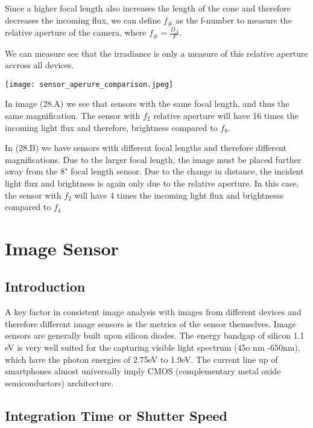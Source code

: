 \documentclass{article}
\begin{document}
Since a higher focal length also increases the length of
the cone and therefore decreases the incoming flux, we can define $ f_{\#}$ as the f-number
to measure the relative aperture of the camera, where $ f_{\#} = \frac{D_A}{F}$.

We can measure see that the irradiance is only a measure of this relative aperture accross all devices.

\begin{center}
  \texttt{[image: sensor\_aperure\_comparison.jpeg]}
\end{center}


In image (28.A) we see that sensors with the same focal length, and thus the same magnification.
The sensor with  $f_2$ relative aperture will have 16 times the incoming light flux and therefore,
brightness compared to $f_8$.

In (28.B) we have sensors with different focal lengths and therefore different magnifications.
Due to the larger focal length, the image must be placed further away from the 8" focal length sensor.
Due to the change in distance, the incident light flux and brightness is again only due to
the relative aperture. In this case, the sensor with $ f_2$ will have 4 times the incoming light flux
and brightnesss compared to $ f_4$

\section{Image Sensor}

\subsection{Introduction}

A key factor in consistent image analysis with images from different devices
and therefore different image sensors is the metrics of the sensor themselves.
Image sensors are generally built upon silicon diodes. The energy bandgap
of silicon 1.1 eV is very well suited for the capturing visible light spectrum (45o nm -650nm), which
have the photon energies of 2.75eV to 1.9eV. The current line up of smartphones almost universally imply CMOS
 (complementary metal oxide semiconductors) architecture.


\subsection{Integration Time or Shutter Speed}
\end{document}
